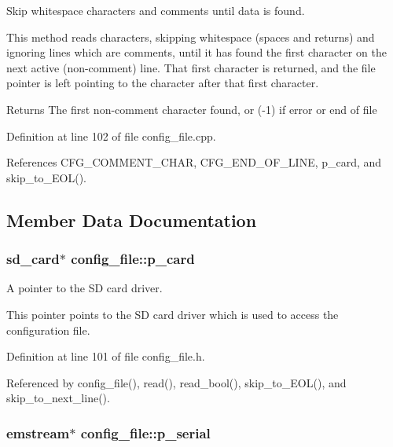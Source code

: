 Skip whitespace characters and comments until data is found. 

This method reads characters, skipping whitespace (spaces and returns) and ignoring lines which are comments, until it has found the first character on the next active (non-\/comment) line. That first character is returned, and the file pointer is left pointing to the character after that first character. \begin{DoxyReturn}{Returns}
The first non-\/comment character found, or (-\/1) if error or end of file 
\end{DoxyReturn}


Definition at line 102 of file config\-\_\-file.\-cpp.



References C\-F\-G\-\_\-\-C\-O\-M\-M\-E\-N\-T\-\_\-\-C\-H\-A\-R, C\-F\-G\-\_\-\-E\-N\-D\-\_\-\-O\-F\-\_\-\-L\-I\-N\-E, p\-\_\-card, and skip\-\_\-to\-\_\-\-E\-O\-L().



\subsection{Member Data Documentation}
\hypertarget{classconfig__file_a7f5e8d1a7a4b760531853d43857fc527}{
\subsubsection[{p\-\_\-card}]{\setlength{\rightskip}{0pt plus 5cm}sd\-\_\-card$\ast$ config\-\_\-file\-::p\-\_\-card\hspace{0.3cm}{\ttfamily [protected]}}}\label{classconfig__file_a7f5e8d1a7a4b760531853d43857fc527}


A pointer to the S\-D card driver. 

This pointer points to the S\-D card driver which is used to access the configuration file. 

Definition at line 101 of file config\-\_\-file.\-h.



Referenced by config\-\_\-file(), read(), read\-\_\-bool(), skip\-\_\-to\-\_\-\-E\-O\-L(), and skip\-\_\-to\-\_\-next\-\_\-line().

\hypertarget{classconfig__file_a529cb0760d01190b93076cb9e7da4746}{
\subsubsection[{p\-\_\-serial}]{\setlength{\rightskip}{0pt plus 5cm}emstream$\ast$ config\-\_\-file\-::p\-\_\-serial\hspace{0.3cm}{\ttfamily [protected]}}}\label{classconfig__file_a529cb0760d01190b93076cb9e7da4746}


